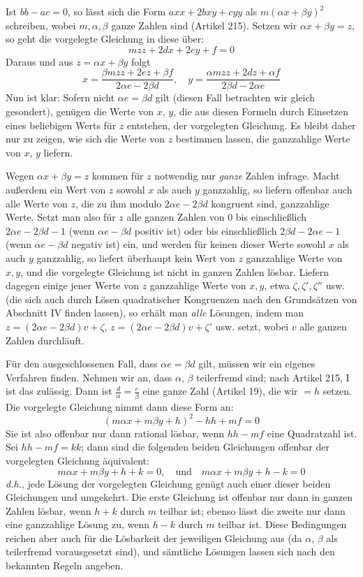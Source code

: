 Ist $bb-ac=0$, so lässt sich die Form $axx+2bxy+cyy$ als $m(\alpha x+\beta y)^2$ schreiben, wobei $m,\alpha,\beta$ ganze Zahlen sind (Artikel 215). Setzen wir $\alpha x+\beta y=z$, so geht die vorgelegte Gleichung in diese über:
\[
mzz+2dx+2ey+f=0
\]
Daraus und aus $z=\alpha x+\beta y$ folgt
\[
x=\frac{\beta mzz+2ez+\beta f}{2\alpha e-2\beta d},\quad
y=\frac{\alpha mzz+2dz+\alpha f}{2\beta d-2\alpha e}
\]
Nun ist klar: Sofern nicht $\alpha e=\beta d$ gilt (diesen Fall betrachten wir gleich gesondert), genügen die Werte von $x$, $y$, die aus diesen Formeln durch Einsetzen eines beliebigen Werts für $z$ entstehen, der vorgelegten Gleichung. Es bleibt daher nur zu zeigen, wie sich die Werte von $z$ bestimmen lassen, die ganzzahlige Werte von $x$, $y$ liefern.

Wegen $\alpha x+\beta y=z$ kommen für $z$ notwendig nur \textit{ganze} Zahlen infrage. Macht außerdem ein Wert von $z$ sowohl $x$ als auch $y$ ganzzahlig, so liefern offenbar auch alle Werte von $z$, die zu ihm modulo $2\alpha e-2\beta d$ kongruent sind, ganzzahlige Werte. Setzt man also für $z$ alle ganzen Zahlen von $0$ bis einschließlich $2\alpha e-2\beta d-1$ (wenn $\alpha e-\beta d$ positiv ist) oder bis einschließlich $2\beta d-2\alpha e-1$ (wenn $\alpha e-\beta d$ negativ ist) ein, und werden für keinen dieser Werte sowohl $x$ als auch $y$ ganzzahlig, so liefert überhaupt kein Wert von $z$ ganzzahlige Werte von $x,y$, und die vorgelegte Gleichung ist nicht in ganzen Zahlen lösbar. Liefern dagegen einige jener Werte von $z$ ganzzahlige Werte von $x,y$, etwa $\zeta,\zeta',\zeta''$ usw. (die sich auch durch Lösen quadratischer Kongruenzen nach den Grundsätzen von Abschnitt IV finden lassen), so erhält man \textit{alle} Lösungen, indem man $z=(2\alpha e-2\beta d)v+\zeta$, $z=(2\alpha e-2\beta d)v+\zeta'$ usw. setzt, wobei $v$ alle ganzen Zahlen durchläuft.

Für den ausgeschlossenen Fall, dass $\alpha e=\beta d$ gilt, müssen wir ein eigenes Verfahren finden. Nehmen wir an, dass $\alpha$, $\beta$ teilerfremd sind; nach Artikel 215, I ist das zulässig. Dann ist $\frac{d}{\alpha}=\frac{e}{\beta}$ eine ganze Zahl (Artikel 19), die wir $=h$ setzen. Die vorgelegte Gleichung nimmt dann diese Form an:
\[
(m\alpha x+m\beta y+h)^2-hh+mf=0
\]
Sie ist also offenbar nur dann rational lösbar, wenn $hh-mf$ eine Quadratzahl ist. Sei $hh-mf=kk$; dann sind die folgenden beiden Gleichungen offenbar der vorgelegten Gleichung äquivalent:
\[
m\alpha x+m\beta y+h+k=0,\quad\text{und}\quad
m\alpha x+m\beta y+h-k=0
\]
\textit{d.h.}, jede Lösung der vorgelegten Gleichung genügt auch einer dieser beiden Gleichungen und umgekehrt. Die erste Gleichung ist offenbar nur dann in ganzen Zahlen lösbar, wenn $h+k$ durch $m$ teilbar ist; ebenso lässt die zweite nur dann eine ganzzahlige Lösung zu, wenn $h-k$ durch $m$ teilbar ist. Diese Bedingungen reichen aber auch für die Lösbarkeit der jeweiligen Gleichung aus (da $\alpha$, $\beta$ als teilerfremd vorausgesetzt sind), und sämtliche Lösungen lassen sich nach den bekannten Regeln angeben.

